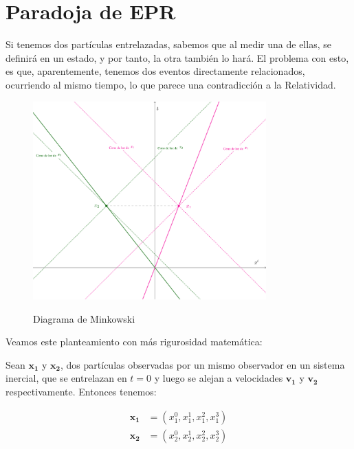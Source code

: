\section{Paradoja de EPR}


Si tenemos dos partículas entrelazadas, sabemos que al medir una de ellas, se definirá en un estado, y por tanto, la otra también lo hará. El problema con esto, es que, aparentemente, tenemos dos eventos directamente relacionados, ocurriendo al mismo tiempo, lo que parece una contradicción a la Relatividad.


% 

\begin{figure}[H]
    \centering
    \includegraphics[width=0.8\textwidth]{Graphics/SpaceLike.pdf}
    \label{fig:SpaceLike}
    \caption{Diagrama de Minkowski}
\end{figure}
\bigskip

Veamos este planteamiento con más rigurosidad matemática:

\medskip

Sean $\mathbf{x_1}$ y $\mathbf{x_2}$, dos partículas observadas por un mismo observador en un sistema inercial, que se entrelazan en $t=0$ y luego se alejan a velocidades $\mathbf{v_1}$ y $\mathbf{v_2}$ respectivamente. Entonces tenemos:

\begin{align*}
    \mathbf{x_1} &= \left(x^0_1,x^1_1,x^2_1,x^3_1\right)\\
    \mathbf{x_2} &= \left(x^0_2,x^1_2,x^2_2,x^3_2\right)
\end{align*}

